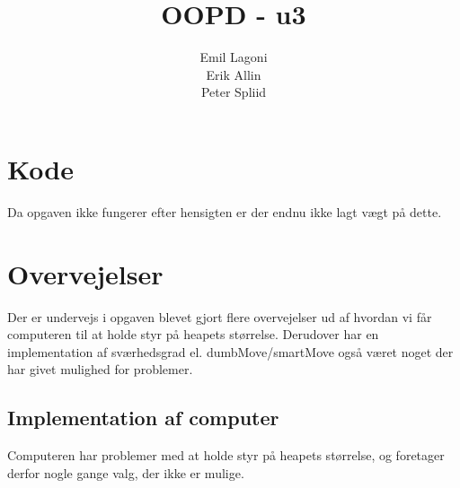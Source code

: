 \documentclass[a4paper,11pt]{article}
\title{\textbf{OOPD - u3}}
\author{Emil Lagoni\\Erik Allin\\Peter Spliid}
\begin{document}
\maketitle
\section*{Kode}
Da opgaven ikke fungerer efter hensigten er der endnu ikke lagt vægt på dette.

\section*{Overvejelser}
Der er undervejs i opgaven blevet gjort flere overvejelser ud af hvordan vi får computeren til at holde styr på heapets størrelse.
Derudover har en implementation af sværhedsgrad el. dumbMove/smartMove også været noget der har givet mulighed for problemer.

\subsection*{Implementation af computer}
Computeren har problemer med at holde styr på heapets størrelse, og foretager derfor nogle gange valg, der ikke er mulige.
\end{document}
